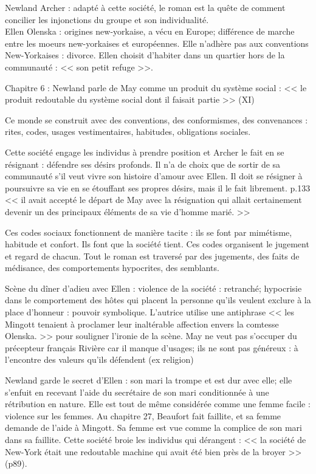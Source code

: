 \documentclass[11pt]{article}
\begin{document}
Newland Archer : adapté à cette société, le roman est la quête de comment concilier les injonctions du groupe et son individualité.\\
Ellen Olenska : origines new-yorkaise, a vécu en Europe; différence de marche entre les moeurs new-yorkaises et européennes. Elle n'adhère pas aux conventions New-Yorkaises : divorce. Ellen choisit d'habiter dans un quartier hors de la communauté : << son petit refuge >>.

Chapitre 6 : Newland parle de May comme un produit du système social : << le produit redoutable du système social dont il faisait partie >> (XI)

Ce monde se construit avec des conventions, des conformismes, des convenances : rites, codes, usages vestimentaires, habitudes, obligations sociales.

Cette société engage les individus à prendre position et Archer le fait en se résignant : défendre ses désirs profonds. Il n'a de choix que de sortir de sa communauté s'il veut vivre son histoire d'amour avec Ellen. Il doit se résigner à poursuivre sa vie en se étouffant ses propres désirs, mais il le fait librement.
p.133 << il avait accepté le départ de May avec la résignation qui allait certainement devenir un des principaux éléments de sa vie d'homme marié. >>

Ces codes sociaux fonctionnent de manière tacite : ils se font par mimétisme, habitude et confort. Ils font que la société tient. Ces codes organisent le jugement et regard de chacun. Tout le roman est traversé par des jugements, des faits de médisance, des comportements hypocrites, des semblants.

Scène du dîner d'adieu avec Ellen : violence de la société : retranché; hypocrisie dans le comportement des hôtes qui placent la personne qu'ils veulent exclure à la place d'honneur : pouvoir symbolique. L'autrice utilise une antiphrase << les Mingott tenaient à proclamer leur inaltérable affection envers la comtesse Olenska. >> pour souligner l'ironie de la scène. 
May ne veut pas s'occuper du précepteur français Rivière car il manque d'usages; ils ne sont pas généreux : à l'encontre des valeurs qu'ils défendent (ex religion)

Newland garde le secret d'Ellen : son mari la trompe et est dur avec elle; elle s'enfuit en recevant l'aide du secrétaire de son mari conditionnée à une rétribution en nature. Elle est tout de même considérée comme une femme facile : violence sur les femmes.
Au chapitre 27, Beaufort fait faillite, et sa femme demande de l'aide à Mingott. Sa femme est vue comme la complice de son mari dans sa faillite. Cette société broie les individus qui dérangent : << la société de New-York était une redoutable machine qui avait été bien près de la broyer >> (p89).
\end{document}
